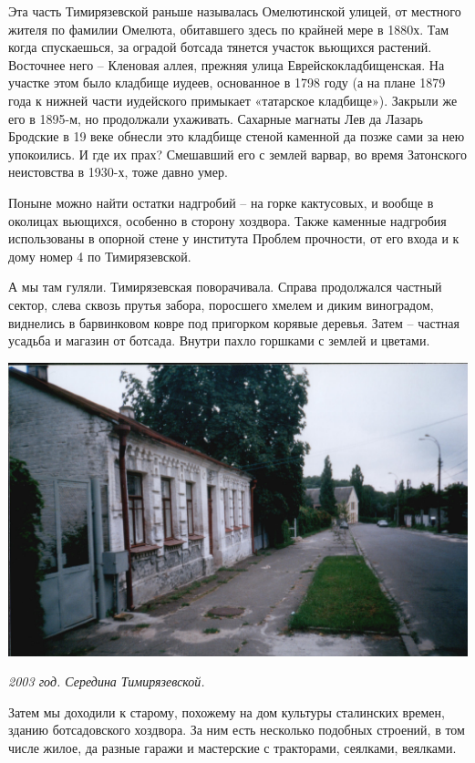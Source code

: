 Эта часть Тимирязевской раньше называлась Омелютинской улицей, от местного жителя по фамилии Омелюта, обитавшего здесь по крайней мере в 1880х. Там когда спускаешься, за оградой ботсада тянется участок вьющихся растений. Восточнее него – Кленовая аллея, прежняя улица Еврейскокладбищенская. На участке этом было кладбище иудеев, основанное в 1798 году (а на плане 1879 года к нижней части иудейского примыкает «татарское кладбище»). Закрыли же его в 1895-м, но продолжали ухаживать. Сахарные магнаты Лев да Лазарь Бродские в 19 веке обнесли это кладбище стеной каменной да позже сами за нею упокоились. И где их прах? Смешавший его с землей варвар, во время Затонского неистовства в 1930-х, тоже давно умер.

Поныне можно найти остатки надгробий – на горке кактусовых, и вообще в околицах вьющихся, особенно в сторону хоздвора. 
Также каменные надгробия использованы в опорной стене у института Проблем прочности, от его входа и к дому номер 4 по Тимирязевской.

А мы там гуляли. Тимирязевская поворачивала. Справа продолжался частный сектор, слева сквозь прутья забора, поросшего хмелем и диким виноградом, виднелись в барвинковом ковре под пригорком корявые деревья. Затем – частная усадьба и магазин от ботсада. Внутри пахло горшками с землей и цветами.

\begin{center}
\includegraphics[width=\linewidth]{chast-vosp/zver/out0014.jpg}

\textit{2003 год. Середина Тимирязевской.}
\end{center}

Затем мы доходили к старому, похожему на дом культуры сталинских времен, зданию ботсадовского хоздвора. За ним есть несколько подобных строений, в том числе жилое, да разные гаражи и мастерские с тракторами, сеялками, веялками.

